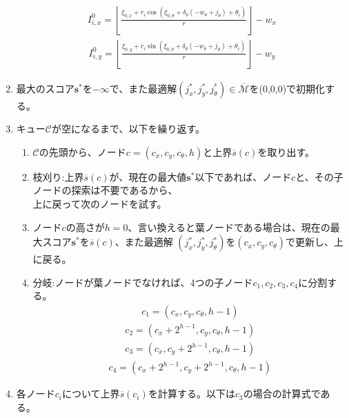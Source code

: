 \begin{enumerate}
\begin{align*}
  \end{align*}
  \begin{align*}
    I_{i,x}^0=\left\lfloor \frac{\xi_{0,x}+r_i\cos(\xi_{0,\theta}+\delta_{\theta}(-w_{\theta}+j_{\theta})+\theta_i)}{r} \right\rfloor - w_x
  \end{align*}
  \begin{align*}
    I_{i,y}^0=\left\lfloor \frac{\xi_{0,y}+r_i\sin(\xi_{0,\theta}+\delta_{\theta}(-w_{\theta}+j_{\theta})+\theta_i)}{r} \right\rfloor - w_y
  \end{align*}
  \item 最大のスコア$\bm{s}^{*}$を$-\infty$で、また最適解$(j_x^{*},j_y^{*},j_{\theta}^{*})\in\overline{\mathcal{M}}$を(0,0,0)で初期化する。
  \item キュー$\mathcal{C}$が空になるまで、以下を繰り返す。
  \begin{enumerate}
    \item $\mathcal{C}$の先頭から、ノード$c=(c_x,c_y,c_{\theta},h)$と上界$\overline{s}(c)$を取り出す。
    \item 枝刈り:上界$\overline{s}(c)$が、現在の最大値$\bm{s}^{*}$以下であれば、ノード$c$と、その子ノードの探索は不要であるから、\\
    上に戻って次のノードを試す。
    \item ノード$c$の高さが$h=0$、言い換えると葉ノードである場合は、現在の最大スコア$\bm{s}^*$を$\overline{s}(c)$、また最適解
    $(j_x^{*},j_y^{*},j_{\theta}^{*})$を$(c_x,c_y,c_{\theta})$で更新し、上に戻る。
    \item 分岐:ノードが葉ノードでなければ、4つの子ノード$c_1,c_2,c_3,c_4$に分割する。\\
    \begin{align*}
      c_1 = (c_x,c_y,c_{\theta},h-1)
    \end{align*}
    \begin{align*}
      c_2 = (c_x+2^{h-1},c_y,c_{\theta},h-1)
    \end{align*}
    \begin{align*}
      c_3 = (c_x,c_y+2^{h-1},c_{\theta},h-1)
    \end{align*}
    \begin{align*}
      c_4 = (c_x+2^{h-1},c_y+2^{h-1},c_{\theta},h-1)
    \end{align*}
  \end{enumerate}
  \item 各ノード$c_i$について上界$\overline{s}(c_i)$を計算する。以下は$c_3$の場合の計算式である。
  \begin{align*}

\end{align*}
\end{enumerate}
